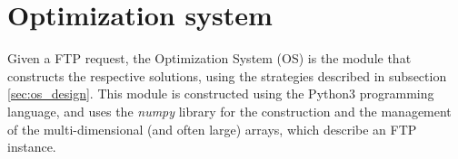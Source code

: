 \section{Optimization system}
\label{sec:os_implementation}

Given a FTP request, the Optimization System (OS) is the module that constructs the respective solutions, using the strategies described in subsection \ref{sec:os_design}. This module is constructed using the Python3 programming language, and uses the \textit{numpy} library \cite{numpy} for the construction and the management of the multi-dimensional (and often large) arrays, which describe an FTP instance.   


